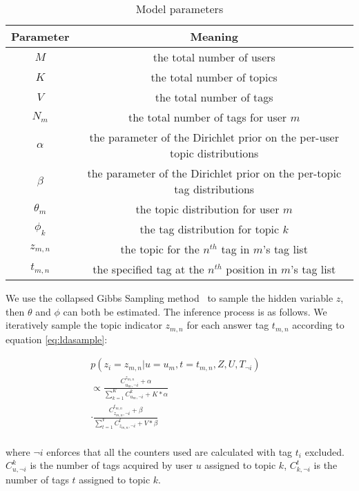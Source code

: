 \begin{table}[htbp]
\caption{Model parameters}
\label{tab:parameters}
\centering
\begin{tabular}{|c|c|}
\hline
Parameter & Meaning \\
\hline
$M$ & the total number of users\\
\hline
$K$ & the total number of topics\\
\hline
$V$ & the total number of tags\\
\hline
$N_m$ & the total number of tags for user $m$\\
\hline
$\alpha$ & the parameter of the Dirichlet prior on the per-user topic distributions \\
\hline
$\beta$ & the parameter of the Dirichlet prior on the per-topic tag distributions  \\
\hline
$\theta_m$ & the topic distribution for user $m$ \\
\hline
$\phi_k$ & the tag distribution for topic $k$ \\
\hline
$z_{m,n}$ & the topic for the $n^{th}$ tag in $m$'s tag list \\
\hline
$t_{m,n}$ & the specified tag at the $n^{th}$ position in $m$'s tag list\\
\hline

\end{tabular}
\end{table}

We use the collapsed Gibbs Sampling method~\cite{griffiths2004finding} to sample the hidden variable $z$, then $\theta$ and $\phi$ can both be estimated.
The inference process is as follows.
We iteratively sample the topic indicator $z_{m,n}$ for each answer tag $t_{m,n}$ according to equation \ref{eq:ldasample}:

\begin{equation}
\begin{split}
p(z_i= z_{m,n} |u=u_m, t=t_{m,n}, Z, U, T_{\neg i}) &\\
\propto \frac{ C_{u_m,\neg i}^{z_{m,n}} + \alpha }{ \sum_{k=1}^K C_{u_m,\neg i}^k + K* \alpha} &\\
\cdot   \frac{ C_{z_{m,n},\neg i}^{t_{m,n}} + \beta }{ \sum_{t=1}^V C_{z_{m,n},\neg i}^t + V* \beta} &\\ 
\end{split}
\label{eq:ldasample}
\end{equation}

\noindent
where $\neg i$ enforces that all the counters used are calculated with tag $t_i$ excluded. $C_{u,\neg i}^k$ is the number of tags acquired by user $u$ assigned to topic $k$, $C_{k,\neg i}^{t}$ is the number of tags $t$ assigned to topic $k$.

